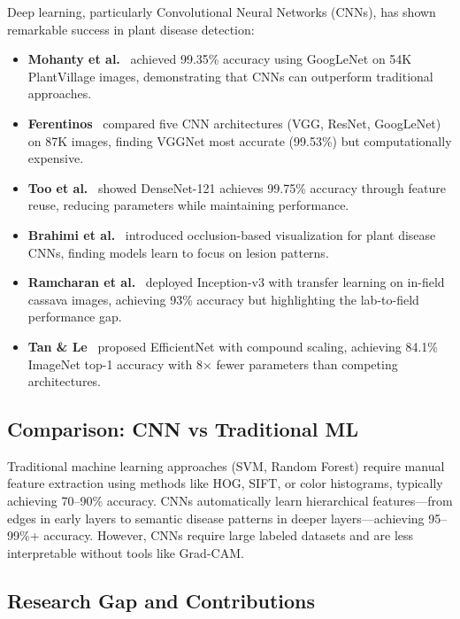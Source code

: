 \documentclass[12pt, a4paper]{article}
\begin{document}
Deep learning, particularly Convolutional Neural Networks (CNNs), has shown remarkable success in plant disease detection:

\begin{itemize}[noitemsep]
    \item \textbf{Mohanty et al.}~\cite{mohanty2016} achieved 99.35\% accuracy using GoogLeNet on 54K PlantVillage images, demonstrating that CNNs can outperform traditional approaches.
    \item \textbf{Ferentinos}~\cite{ferentinos2018} compared five CNN architectures (VGG, ResNet, GoogLeNet) on 87K images, finding VGGNet most accurate (99.53\%) but computationally expensive.
    \item \textbf{Too et al.}~\cite{too2019} showed DenseNet-121 achieves 99.75\% accuracy through feature reuse, reducing parameters while maintaining performance.
    \item \textbf{Brahimi et al.}~\cite{brahimi2017} introduced occlusion-based visualization for plant disease CNNs, finding models learn to focus on lesion patterns.
    \item \textbf{Ramcharan et al.}~\cite{ramcharan2017} deployed Inception-v3 with transfer learning on in-field cassava images, achieving 93\% accuracy but highlighting the lab-to-field performance gap.
    \item \textbf{Tan \& Le}~\cite{tan2019} proposed EfficientNet with compound scaling, achieving 84.1\% ImageNet top-1 accuracy with 8$\times$ fewer parameters than competing architectures.
\end{itemize}

\subsection{Comparison: CNN vs Traditional ML}

Traditional machine learning approaches (SVM, Random Forest) require manual feature extraction using methods like HOG, SIFT, or color histograms, typically achieving 70--90\% accuracy. CNNs automatically learn hierarchical features---from edges in early layers to semantic disease patterns in deeper layers---achieving 95--99\%+ accuracy. However, CNNs require large labeled datasets and are less interpretable without tools like Grad-CAM.

\subsection{Research Gap and Contributions}
\end{document}
